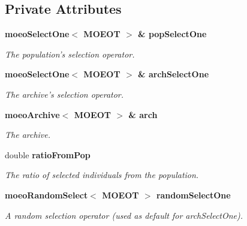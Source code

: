 \subsection*{Private Attributes}
\begin{CompactItemize}
\item 
\bf{moeo\-Select\-One}$<$ MOEOT $>$ \& \bf{pop\-Select\-One}\label{classmoeoSelectFromPopAndArch_e16fb61bf9c115b0a34528e512d30ac6}

\begin{CompactList}\small\item\em The population's selection operator. \item\end{CompactList}\item 
\bf{moeo\-Select\-One}$<$ MOEOT $>$ \& \bf{arch\-Select\-One}\label{classmoeoSelectFromPopAndArch_a34f3871b3a9f94614a15c381c2fa570}

\begin{CompactList}\small\item\em The archive's selection operator. \item\end{CompactList}\item 
\bf{moeo\-Archive}$<$ MOEOT $>$ \& \bf{arch}\label{classmoeoSelectFromPopAndArch_e87de22341f2225ea94ee2895a7eb4a6}

\begin{CompactList}\small\item\em The archive. \item\end{CompactList}\item 
double \bf{ratio\-From\-Pop}\label{classmoeoSelectFromPopAndArch_78a1e18111b46c447c86a0f77484d970}

\begin{CompactList}\small\item\em The ratio of selected individuals from the population. \item\end{CompactList}\item 
\bf{moeo\-Random\-Select}$<$ MOEOT $>$ \bf{random\-Select\-One}\label{classmoeoSelectFromPopAndArch_d6094492eed214e3bdb0330620a5890a}

\begin{CompactList}\small\item\em A random selection operator (used as default for arch\-Select\-One). \item\end{CompactList}\end{CompactItemize}


